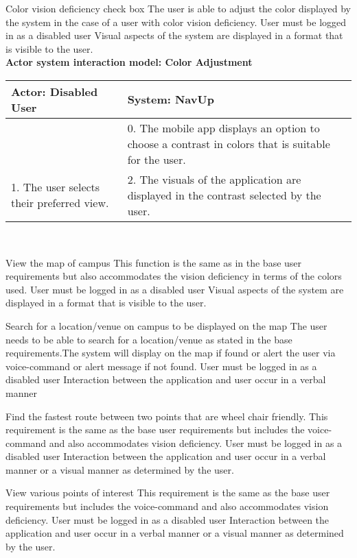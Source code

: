 \FuncReq
{Color vision deficiency check box}
{The user is able to adjust the color displayed by the system in the case of a user with color vision deficiency.}
{User must be logged in as a disabled user}
{Visual aspects of the system are displayed in a format that is visible to the user.}
    \\
    \textbf{Actor system interaction model: Color Adjustment}\\
    \begin{tabular}{ | p{6cm} | p{6cm} |}
    \hline
    Actor: Disabled User & System: NavUp \\ \hline
     & 0. The mobile app displays an option to choose a contrast in colors that is suitable for the user.\\ \hline
    1. The user selects their preferred view. & 2. The visuals of the application are displayed in the contrast selected by the user.\\ \hline   
    \end{tabular}
\\
\bigskip

\FuncReq
{View the map of campus}
{This function is the same as in the base user requirements but also accommodates the vision deficiency in terms of the colors used.}
{User must be logged in as a disabled user}
{Visual aspects of the system are displayed in a format that is visible to the user.}

\FuncReq
{Search for a location/venue on campus to be displayed on the map}
{The user needs to be able to search for a location/venue as stated in the base requirements.The system will display on the map if found or alert the user via voice-command or alert message if not found.}
{User must be logged in as a disabled user}
{Interaction between the application and user occur in a verbal manner}

\FuncReq
{Find the fastest route between two points that are wheel chair friendly.}%
{ This requirement is the same as the base user requirements but includes the voice-command and also accommodates vision deficiency.}
{User must be logged in as a disabled user}
{Interaction between the application and user occur in a verbal manner or a visual manner as determined by the user.}

\FuncReq
{View various points of interest}
{This requirement is the same as the base user requirements but includes the voice-command and also accommodates vision deficiency.}
{User must be logged in as a disabled user}
{Interaction between the application and user occur in a verbal manner or a visual manner as determined by the user.}


